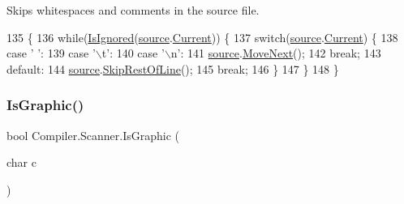 Skips whitespaces and comments in the source file. 
\begin{DoxyCode}
135                                                \{
136                     \textcolor{keywordflow}{while}(\mbox{\hyperlink{class_compiler_1_1_scanner_adb2fc8cf5a107c41d73e00eb93a98ca2}{IsIgnored}}(\mbox{\hyperlink{class_compiler_1_1_scanner_a6fa17eef62c3cf43853464ccfbd61966}{source}}.\mbox{\hyperlink{class_compiler_1_1_source_file_a4a0d8f66b3c7de70edadb1761aaf65b5}{Current}})) \{
137                         \textcolor{keywordflow}{switch}(\mbox{\hyperlink{class_compiler_1_1_scanner_a6fa17eef62c3cf43853464ccfbd61966}{source}}.\mbox{\hyperlink{class_compiler_1_1_source_file_a4a0d8f66b3c7de70edadb1761aaf65b5}{Current}}) \{
138                             \textcolor{keywordflow}{case} \textcolor{charliteral}{' '}:
139                             \textcolor{keywordflow}{case} \textcolor{charliteral}{'\(\backslash\)t'}:
140                             \textcolor{keywordflow}{case} \textcolor{charliteral}{'\(\backslash\)n'}:
141                                 \mbox{\hyperlink{class_compiler_1_1_scanner_a6fa17eef62c3cf43853464ccfbd61966}{source}}.\mbox{\hyperlink{class_compiler_1_1_source_file_ad80d0f3a9ead18dce6baad58971838bb}{MoveNext}}();
142                                 \textcolor{keywordflow}{break};
143                             \textcolor{keywordflow}{default}:
144                                 \mbox{\hyperlink{class_compiler_1_1_scanner_a6fa17eef62c3cf43853464ccfbd61966}{source}}.\mbox{\hyperlink{class_compiler_1_1_source_file_a236483cd300f9793eed183d32959c7bd}{SkipRestOfLine}}();
145                                 \textcolor{keywordflow}{break};
146                         \}
147                     \}
148                 \}
\end{DoxyCode}
\mbox{\label{class_compiler_1_1_scanner_a6b4be2a8e2aa19e24ecb1abc692dcebc}} 
\subsubsection{\texorpdfstring{Is\+Graphic()}{IsGraphic()}}
{\footnotesize\ttfamily bool Compiler.\+Scanner.\+Is\+Graphic (\begin{DoxyParamCaption}\item[{char}]{c }\end{DoxyParamCaption})\hspace{0.3cm}{\ttfamily [protected]}}

